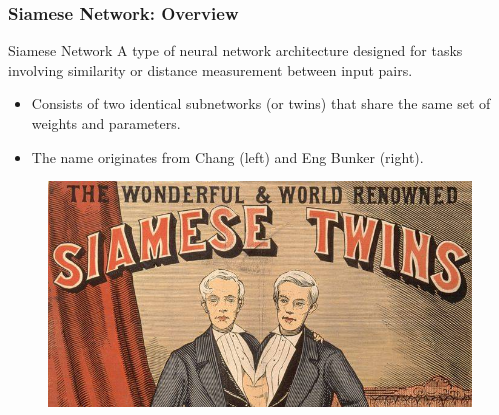 \documentclass[13.5pt,aspecratio=169, xcolor=dvipsnames]{beamer}
\begin{document}



\begin{frame}
\onehalfspacing
	\frametitle{Siamese Network: Overview}
    \begin{block}{Siamese Network}
        A type of neural network architecture designed for tasks involving similarity or distance measurement between input pairs. 
        \begin{itemize}
            \item Consists of two identical subnetworks (or twins) that share the same set of weights and parameters.
            \item The name originates from Chang (left) and Eng Bunker (right).
        \end{itemize}
    \end{block}

    \begin{figure}
        \centering
        \includegraphics[scale=0.3]{Siamese_Twin.jpg}
    \end{figure}
\end{frame}
\end{document}
